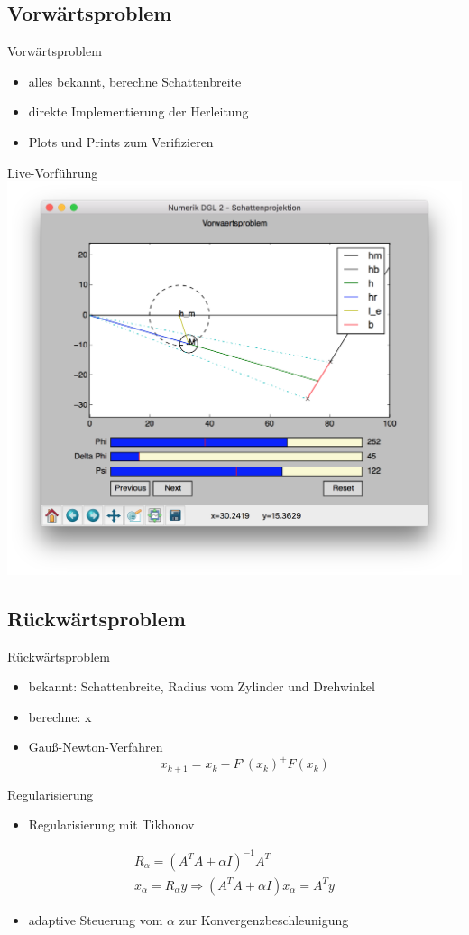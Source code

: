 \documentclass[compress]{beamer}
\begin{document}
\subsection{Vorwärtsproblem}
\begin{frame}{Vorwärtsproblem}
	\begin{itemize}
		\item alles bekannt, berechne Schattenbreite
		\item direkte Implementierung der Herleitung
		\item Plots und Prints zum Verifizieren
	\end{itemize}
	\centering
	\vspace{0.2cm}
	Live-Vorführung\\
	\includegraphics[width=0.6\linewidth]{images/vorfuehrung.png}
\end{frame}

\subsection{Rückwärtsproblem}
\begin{frame}{Rückwärtsproblem}
	\begin{itemize}
		\item bekannt: Schattenbreite, Radius vom Zylinder und Drehwinkel
		\item berechne: x
		\vspace{0.4cm}
		\item Gauß-Newton-Verfahren
		$$x_{k+1} = x_k − F′(x_k)^+F(x_k)$$
	\end{itemize}
\end{frame}

\begin{frame}{Regularisierung}
	\begin{itemize}
		\item Regularisierung mit Tikhonov
	\end{itemize}
	\begin{align}
		R_\alpha =(A^TA+\alpha I)^{-1}A^T\\
		x_\alpha = R_\alpha y \Rightarrow (A^TA+\alpha I)x_\alpha =A^Ty
	\end{align}
	\begin{itemize}
		\item adaptive Steuerung vom $\alpha$ zur Konvergenzbeschleunigung
	\end{itemize}
\end{frame}
\end{document}
